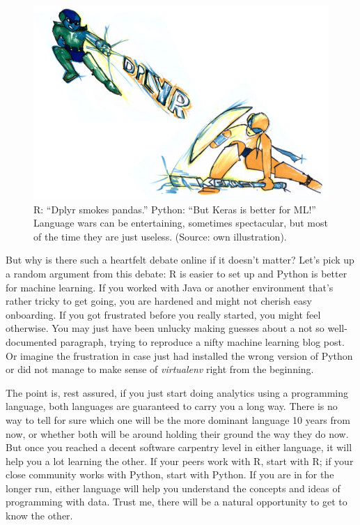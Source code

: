 \documentclass[
  12pt,
  letterpaper,
]{krantz}
\begin{document}
\begin{figure}

{\centering \includegraphics{./images/languagewar.jpg}

}

\caption{R: ``Dplyr smokes pandas.'' Python: ``But Keras is better for
ML!'' Language wars can be entertaining, sometimes spectacular, but most
of the time they are just useless. (Source: own illustration).}

\end{figure}

But why is there such a heartfelt debate online if it doesn't matter?
Let's pick up a random argument from this debate: R is easier to set up
and Python is better for machine learning. If you worked with Java or
another environment that's rather tricky to get going, you are hardened
and might not cherish easy onboarding. If you got frustrated before you
really started, you might feel otherwise. You may just have been unlucky
making guesses about a not so well-documented paragraph, trying to
reproduce a nifty machine learning blog post. Or imagine the frustration
in case just had installed the wrong version of Python or did not manage
to make sense of \emph{virtualenv} right from the beginning.

The point is, rest assured, if you just start doing analytics using a
programming language, both languages are guaranteed to carry you a long
way. There is no way to tell for sure which one will be the more
dominant language 10 years from now, or whether both will be around
holding their ground the way they do now. But once you reached a decent
software carpentry level in either language, it will help you a lot
learning the other. If your peers work with R, start with R; if your
close community works with Python, start with Python. If you are in for
the longer run, either language will help you understand the concepts
and ideas of programming with data. Trust me, there will be a natural
opportunity to get to know the other.
\end{document}
